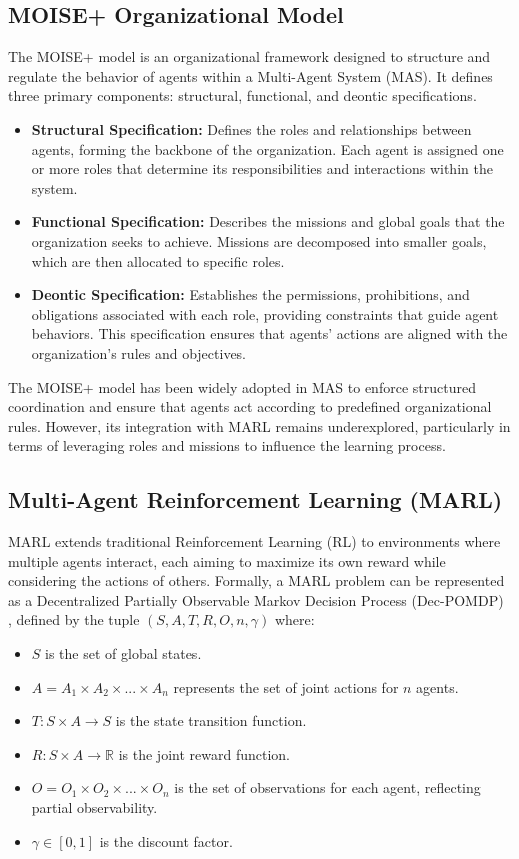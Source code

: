 \documentclass[sigconf,anonymous]{aamas}
\begin{document}
\subsection{MOISE+ Organizational Model}
The MOISE+ model \cite{moise_reference} is an organizational framework designed to structure and regulate the behavior of agents within a Multi-Agent System (MAS). It defines three primary components: structural, functional, and deontic specifications.

\begin{itemize}
    \item \textbf{Structural Specification:} Defines the roles and relationships between agents, forming the backbone of the organization. Each agent is assigned one or more roles that determine its responsibilities and interactions within the system.
    \item \textbf{Functional Specification:} Describes the missions and global goals that the organization seeks to achieve. Missions are decomposed into smaller goals, which are then allocated to specific roles.
    \item \textbf{Deontic Specification:} Establishes the permissions, prohibitions, and obligations associated with each role, providing constraints that guide agent behaviors. This specification ensures that agents' actions are aligned with the organization's rules and objectives.
\end{itemize}

The MOISE+ model has been widely adopted in MAS to enforce structured coordination and ensure that agents act according to predefined organizational rules. However, its integration with MARL remains underexplored, particularly in terms of leveraging roles and missions to influence the learning process.

\subsection{Multi-Agent Reinforcement Learning (MARL)}
MARL extends traditional Reinforcement Learning (RL) to environments where multiple agents interact, each aiming to maximize its own reward while considering the actions of others. Formally, a MARL problem can be represented as a Decentralized Partially Observable Markov Decision Process (Dec-POMDP) \cite{dec_pomdp_reference}, defined by the tuple $(S, A, T, R, O, n, \gamma)$ where:

\begin{itemize}
    \item $S$ is the set of global states.
    \item $A = A_1 \times A_2 \times ... \times A_n$ represents the set of joint actions for $n$ agents.
    \item $T: S \times A \rightarrow S$ is the state transition function.
    \item $R: S \times A \rightarrow \mathbb{R}$ is the joint reward function.
    \item $O = O_1 \times O_2 \times ... \times O_n$ is the set of observations for each agent, reflecting partial observability.
    \item $\gamma \in [0,1]$ is the discount factor.
\end{itemize}
\end{document}
